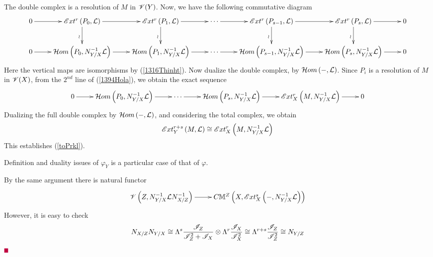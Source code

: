 \documentclass[12pt]{article}
\begin{document}
The double complex is a resolution of $M$ in ${\mathscr {V}}(Y)$. 
Now, we have  the following commutative diagram %
{
\begin{equation}\label{1394Hola}
\diagram 
0 \ar[r] & {\SE}xt^r\LRf{P_0, {\CL}}\ar[r] \ar[d]_{\wr} &  {\SE}xt^r\LRf{P_1, {\CL}}\ar[r] \ar[d]_{\wr} & \cdots \ar[r] &  {\SE}xt^r\LRf{P_{s-1}, {\CL}}\ar[r] \ar[d]_{\wr} & {\SE}xt^r\LRf{P_s, {\CL}}\ar[r]\ar[d]_{\wr}  & 0\\
0 \ar[r] & {\CH}om\LRf{P_0, N_{Y/X}^{-1}{\CL}}\ar[r] &  {\CH}om\LRf{P_1, N_{Y/X}^{-1}{\CL}}\ar[r] & \cdots \ar[r] &  
 {\CH}om\LRf{P_{s-1}, N_{Y/X}^{-1}{\CL}}\ar[r] & {\CH}om\LRf{P_s, N_{Y/X}^{-1}{\CL}}\ar[r] & 0\\
\enddiagram 
\end{equation}
}
Here the vertical maps are isomorphisms by  (\ref{1316Thinht}). Now dualize the double complex, by ${\mathcal{H}}om\left( -, {\mathcal{L}}\right)$. 
Since $P_i$ is a resolution of $M$ in ${\mathscr {V}}(X)$, from the $2^{nd}$ line of (\ref{1394Hola}), we obtain  the exact sequence 
$$
\diagram 
0 \ar[r] & {\CH}om\LRf{P_0, N_{Y/X}^{-1}{\CL}}\ar[r] %
& \cdots \ar[r] &  
  {\CH}om\LRf{P_s, N_{Y/X}^{-1}{\CL}}\ar[r] & {\SE}xt^{r}_X\LRf{M, N_{Y/X}^{-1}{\CL}}\ar[r] & 0\\
\enddiagram 
$$
Dualizing the full double complex by ${\mathcal{H}}om\left( -, {\mathcal{L}}\right)$, and considering the total complex, we obtain
$$
{\mathscr {E}}xt^{r+s}_Y\left( M, {\mathcal{L}}\right)\cong {\mathscr {E}}xt^{r}_X\left( M, N_{Y/X}^{-1}{\mathcal{L}}\right)
$$
This establishes (\ref{toPrkl}). 
\bE
\item Definition and duality issues of $\varphi_Y$ is a particular case of that of $\varphi$. 
\item By the same argument there is natural functor 
$$
\diagram 
{\SV}\LRf{Z, N_{Y/X}^{-1}{\CL} N_{X/Z}^{-1}} \ar[r] & C{\BM}^Z\LRf{X, {\SE}xt^s_X\LRf{-, N_{Y/X}^{-1}{\CL}}} \\
\enddiagram 
$$
However, it is easy to check
$$
  N_{X/Z}N_{Y/X}\cong \Lambda^s\frac{{\mathscr {I}}_Z}{{\mathscr {I}}_Z^2+{\mathscr {I}}_X}\otimes \Lambda^r \frac{{\mathscr {I}}_X}{{\mathscr {I}}_X^2}
  \cong \Lambda^{r+s} \frac{{\mathscr {I}}_Z}{{\mathscr {I}}_Z^2}
  \cong N_{Y/Z}
$$
\eE 
\pic $\eop$ 







 
\end{document}
